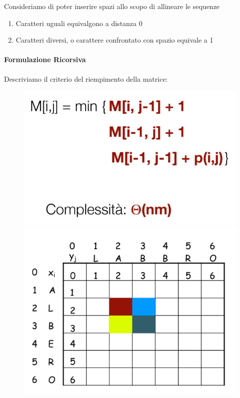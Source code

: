 \documentclass{article}
\begin{document}
Consideriamo di poter inserire spazi allo scopo di allineare le sequenze 

\begin{enumerate}
    \item Caratteri uguali equivalgono a distanza 0
    \item Caratteri diversi, o carattere confrontato con spazio equivale a 1
\end{enumerate}

\paragraph{Formulazione Ricorsiva} Descriviamo il criterio del riempimento della matrice: 

\begin{figure}[htbp]
        \center
        \includegraphics[scale=0.4]{img/editDistance1.png}
        \includegraphics[scale=0.4]{img/editDistance2.png}
\end{figure}
\end{document}
